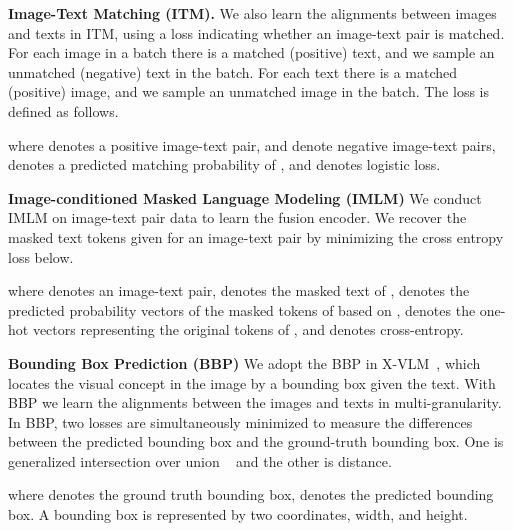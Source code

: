 \documentclass[11pt]{article}
\begin{document}
{\bf Image-Text Matching (ITM).}
We also learn the alignments between images and texts in ITM, using a loss indicating whether an image-text pair is matched. 
For each image in a batch there is a matched (positive) text, and we sample an unmatched (negative) text in the batch. For each text there is a matched (positive) image, and we sample an unmatched image in the batch.
The loss is defined as follows.

{\setlength\abovedisplayskip{-0.2cm}
\setlength\belowdisplayskip{0.2cm}
}
where  denotes a positive image-text pair,  and  denote negative image-text pairs,  denotes a predicted matching probability of , and  denotes logistic loss.

{\bf Image-conditioned Masked Language Modeling (IMLM)}
We conduct IMLM on image-text pair data to learn the fusion encoder. We recover the masked text tokens given for an image-text pair by minimizing the cross entropy loss below.

{\setlength\abovedisplayskip{-0.2cm}
\setlength\belowdisplayskip{0.2cm}
}
where  denotes an image-text pair,  denotes the masked text of ,  denotes the predicted probability vectors of the masked tokens of  based on ,  denotes the one-hot vectors representing the original tokens of , and  denotes cross-entropy. 

{\bf Bounding Box Prediction (BBP)}
We adopt the BBP in X-VLM~\citep{zeng2021multi,zeng2022x}, which locates the visual concept in the image by a bounding box given the text. With BBP we learn the alignments between the images and texts in multi-granularity. In BBP, two losses are simultaneously minimized to measure the differences between the predicted bounding box and the ground-truth bounding box. One is generalized intersection over union ~\citep{rezatofighi2019generalized} and the other is  distance.

{\setlength\abovedisplayskip{-0.2cm}
\setlength\belowdisplayskip{0.2cm}
}
where  denotes the ground truth bounding box,  denotes the predicted bounding box. A bounding box is represented by two coordinates, width, and height. 
\end{document}
